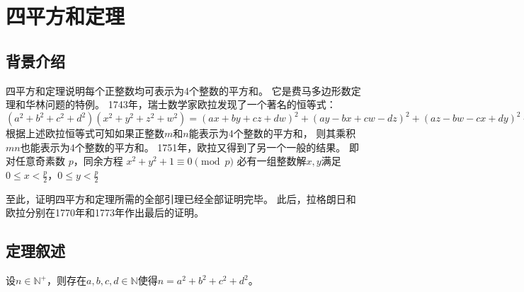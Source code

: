 \documentclass[main]{subfiles}
\begin{document}
\renewcommand{\filename}{No.10Theorem}%
\section{四平方和定理}
\subsection{背景介绍}
四平方和定理说明每个正整数均可表示为4个整数的平方和。
它是费马多边形数定理和华林问题的特例。
1743年，瑞士数学家欧拉发现了一个著名的恒等式：
\((a^2+b^2+c^2+d^2)(x^2+y^2+z^2+w^2)=(ax+by+cz+dw)^2+(ay-bx+cw-dz)^2+(az-bw-cx+dy)^2+(aw+bz-cy-dx)^2\)
根据上述欧拉恒等式可知如果正整数\(m\)和\(n\)能表示为4个整数的平方和，
则其乘积\(mn\)也能表示为4个整数的平方和。
1751年，欧拉又得到了另一个一般的结果。
即对任意奇素数 \(p\)，同余方程
\(x^2+y^2+1 \equiv 0\pmod p\)
必有一组整数解\(x,y\)满足\(0 \le x<\frac{p}{2}\)，\(0 \le y<\frac{p}{2}\)

至此，证明四平方和定理所需的全部引理已经全部证明完毕。
此后，拉格朗日和欧拉分别在1770年和1773年作出最后的证明。

\subsection{定理叙述}
\begin{theorem}\label{the:1}
	设\(n \in \mathbb{N}^+\)，则存在\(a,b,c,d \in \mathbb{N}\)使得\(n=a^2 +b^2 + c^2 + d^2\)。
\end{theorem}
\end{document}
